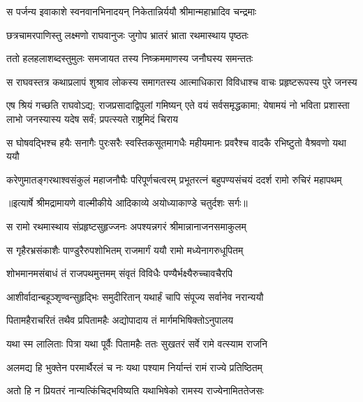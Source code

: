\twolineshloka
{स पर्जन्य इवाकाशे स्वनवानभिनादयन्}
{निकेतान्निर्ययौ श्रीमान्महाभ्रादिव चन्द्रमाः} %

\twolineshloka
{छत्रचामरपाणिस्तु लक्ष्मणो राघवानुजः}
{जुगोप भ्रातरं भ्राता रथमास्थाय पृष्ठतः} %

\twolineshloka
{ततो हलहलाशब्दस्तुमुलः समजायत}
{तस्य निष्क्रममाणस्य जनौघस्य समन्ततः} %

\fourlineindentedshloka
{स राघवस्तत्र कथाप्रलापं}
{ शुश्राव लोकस्य समागतस्य}
{आत्माधिकारा विविधाश्च वाचः}
{ प्रहृष्टरूपस्य पुरे जनस्य} %

\threelineshloka
{एष श्रियं गच्छति राघवोऽद्य; राजप्रसादाद्विपुलां गमिष्यन्}
{एते वयं सर्वसमृद्धकामा; येषामयं नो भविता प्रशास्ता}
{लाभो जनस्यास्य यदेष सर्वं; प्रपत्स्यते राष्ट्रमिदं चिराय} %

\fourlineindentedshloka
{स घोषवद्भिश्च हयैः सनागैः}
{ पुरःसरैः स्वस्तिकसूतमागधैः}
{महीयमानः प्रवरैश्च वादकै}
{रभिष्टुतो वैश्रवणो यथा ययौ} %

\fourlineindentedshloka
{करेणुमातङ्गरथाश्वसंकुलं}
{ महाजनौघैः परिपूर्णचत्वरम्}
{प्रभूतरत्नं बहुपण्यसंचयं}
{ ददर्श रामो रुचिरं महापथम्} %


{॥इत्यार्षे श्रीमद्रामायणे वाल्मीकीये आदिकाव्ये अयोध्याकाण्डे चतुर्दशः सर्गः॥}


\twolineshloka
{स रामो रथमास्थाय संप्रहृष्टसुहृज्जनः}
{अपश्यन्नगरं श्रीमान्नानाजनसमाकुलम्} %

\twolineshloka
{स गृहैरभ्रसंकाशैः पाण्डुरैरुपशोभितम्}
{राजमार्गं ययौ रामो मध्येनागरुधूपितम्} %

\twolineshloka
{शोभमानमसंबाधं तं राजपथमुत्तमम्}
{संवृतं विविधैः पण्यैर्भक्ष्यैरुच्चावचैरपि} %

\twolineshloka
{आशीर्वादान्बहूञ्शृण्वन्सुहृद्भिः समुदीरितान्}
{यथार्हं चापि संपूज्य सर्वानेव नरान्ययौ} %

\twolineshloka
{पितामहैराचरितं तथैव प्रपितामहैः}
{अद्योपादाय तं मार्गमभिषिक्तोऽनुपालय} %

\twolineshloka
{यथा स्म लालिताः पित्रा यथा पूर्वैः पितामहैः}
{ततः सुखतरं सर्वे रामे वत्स्याम राजनि} %

\twolineshloka
{अलमद्य हि भुक्तेन परमार्थैरलं च नः}
{यथा पश्याम निर्यान्तं रामं राज्ये प्रतिष्ठितम्} %

\twolineshloka
{अतो हि न प्रियतरं नान्यत्किंचिद्भविष्यति}
{यथाभिषेको रामस्य राज्येनामिततेजसः} %

